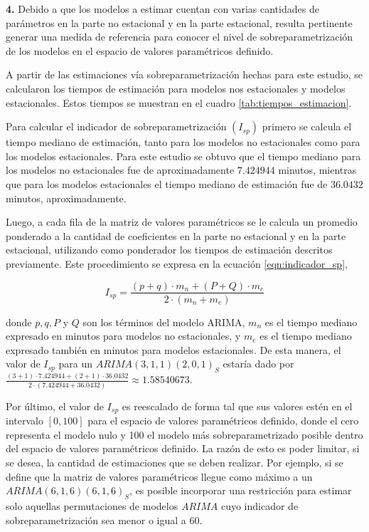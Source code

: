 \documentclass[
]{article}
\begin{document}
\textbf{4.} Debido a que los modelos a estimar cuentan con varias
cantidades de parámetros en la parte no estacional y en la parte
estacional, resulta pertinente generar una medida de referencia para
conocer el nivel de sobreparametrización de los modelos en el espacio de
valores paramétricos definido.

A partir de las estimaciones vía sobreparametrización hechas para este
estudio, se calcularon los tiempos de estimación para modelos nos
estacionales y modelos estacionales. Estos tiempos se muestran en el
cuadro \ref{tab:tiempos_estimacion}.

Para calcular el indicador de sobreparametrización \((I_{sp})\) primero
se calcula el tiempo mediano de estimación, tanto para los modelos no
estacionales como para los modelos estacionales. Para este estudio se
obtuvo que el tiempo mediano para los modelos no estacionales fue de
aproximadamente \(7.424944\) minutos, mientras que para los modelos
estacionales el tiempo mediano de estimación fue de \(36.0432\) minutos,
aproximadamente.

Luego, a cada fila de la matriz de valores paramétricos se le calcula un
promedio ponderado a la cantidad de coeficientes en la parte no
estacional y en la parte estacional, utilizando como ponderador los
tiempos de estimación descritos previamente. Este procedimiento se
expresa en la ecuación \ref{eqn:indicador_sp},

\begin{equation}
\label{eqn:indicador_sp}
I_{sp} = \frac{(p+q) \cdot m_n + (P+Q) \cdot m_e}{2\cdot(m_n+m_e)}
\end{equation}

donde \(p,q,P\) y \(Q\) son los términos del modelo ARIMA, \(m_n\) es el
tiempo mediano expresado en minutos para modelos no estacionales, y
\(m_e\) es el tiempo mediano expresado también en minutos para modelos
estacionales. De esta manera, el valor de \(I_{sp}\) para un
\(ARIMA(3,1,1)(2,0,1)_S\) estaría dado por
\(\frac{(3+1) \cdot 7.424944 + (2+1) \cdot 36.0432}{2\cdot(7.424944+36.0432)} \approx 1.58540673\).

Por último, el valor de \(I_{sp}\) es reescalado de forma tal que sus
valores estén en el intervalo \([0,100]\) para el espacio de valores
paramétricos definido, donde el cero representa el modelo nulo y 100 el
modelo más sobreparametrizado posible dentro del espacio de valores
paramétricos definido. La razón de esto es poder limitar, si se desea,
la cantidad de estimaciones que se deben realizar. Por ejemplo, si se
define que la matriz de valores paramétricos llegue como máximo a un
\(ARIMA(6,1,6)(6,1,6)_S\), es posible incorporar una restricción para
estimar solo aquellas permutaciones de modelos \(ARIMA\) cuyo indicador
de sobreparametrización sea menor o igual a 60.
\end{document}
